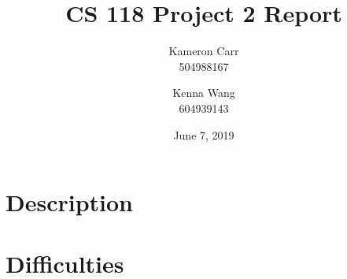 \documentclass[12pt]{article}
\title{CS 118 Project 2 Report}
\author{Kameron Carr \\ 504988167 \and Kenna Wang \\ 604939143}
\date{June 7, 2019}
\begin{document}
\maketitle

\section{Description}

\section{Difficulties}
\end{document}
